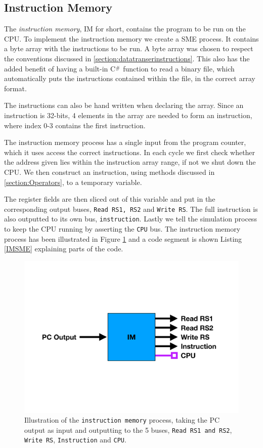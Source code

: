     \subsection{Instruction Memory}
        The \textit{instruction memory}, IM for short, contains the program to be run on the CPU. To implement the instruction memory we create a SME process. It contains a byte array with the instructions to be run. A byte array was chosen to respect the conventions discussed in \ref{section:datatranserinstructions}. This also has the added benefit of having a built-in C$\scalerel*{\#}{X}$ function to read a binary file, which automatically puts the instructions contained within the file, in the correct array format. 
        
        The instructions can also be hand written when declaring the array. Since an instruction is 32-bits, 4 elements in the array are needed to form an instruction, where index 0-3 contains the first instruction.
        
        The instruction memory process has a single input from the program counter, which it uses access the correct instructions. In each cycle we first check whether the address given lies within the instruction array range, if not we shut down the CPU.
        We then construct an instruction, using methods discussed in \ref{section:Operators}, to a temporary variable.
        
        The register fields are then sliced out of this variable and put in the corresponding output buses, \texttt{Read RS1, RS2} and \texttt{Write RS}. The full instruction is also outputted to its own bus, \texttt{instruction}. Lastly we tell the simulation process to keep the CPU running by asserting the \texttt{CPU} bus. The instruction memory process has been illustrated in Figure \ref{fig:IM} and a code segment is shown Listing \ref{IMSME} explaining parts of the code. 
     
        \begin{figure}[h!]
            \centering
            \includegraphics[scale=0.34]{pictures/IM.pdf}
            \caption{Illustration of the \texttt{instruction memory} process, taking the PC output as input and outputting to the 5 buses, \texttt{Read RS1 and RS2}, \texttt{Write RS}, \texttt{Instruction} and \texttt{CPU}.}
            \label{fig:IM}
        \end{figure}
    
